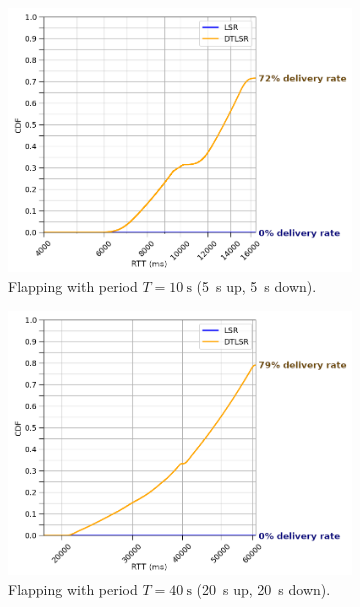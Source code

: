 \documentclass[withindex,glossary,openany]{cam-thesis}
\begin{document}
\begin{figure}[H]
\centering
\begin{subfigure}{.8\textwidth}
  \centering
  \includegraphics[width=1\linewidth]{delay_full_partition_flap5}
  \caption{Flapping with period $T=\SI{10}{\s}$ (\SI{5}{\s} up, \SI{5}{\s} down).}
  \label{fig:full_partition_flap5}
\end{subfigure}

\begin{subfigure}{.8\textwidth}
  \centering
  \includegraphics[width=1\linewidth]{delay_full_partition_flap20}
  \caption{Flapping with period $T=\SI{40}{\s}$ (\SI{20}{\s} up, \SI{20}{\s} down).}
  \label{fig:full_partition_flap20}
\end{subfigure}
\caption{}
\label{fig:full_partition_flap}
\end{figure}
\end{document}
